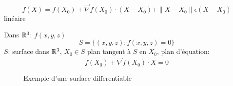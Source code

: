 \begin{eg}
   \[
       f(X) = f(X_0) + \vec{\nabla}f(X_0) \cdot (X - X_0) + \|X - X_0\| \epsilon(X - X_0)
   \]  
   linéaire
   \par
   Dans $\mathbb{R}^3$: $f(x, y, z)$
    \[
        S = \{(x, y, z): f(x, y, z) = 0 \}
   \] 
   $S$: surface dans  $\mathbb{R}^3$, $X_0 \in S$ plan tangent à $S$ en  $X_0$, plan d'équation:
   \[
       f(X_0) + \vec{\nabla}f(X_0)\cdot X = 0
   \] 
\begin{figure}[H]
    \centering
    \caption{Exemple d'une surface differentiable}
    \label{fig:surface-s-differentiable}
\end{figure}
\end{eg}
